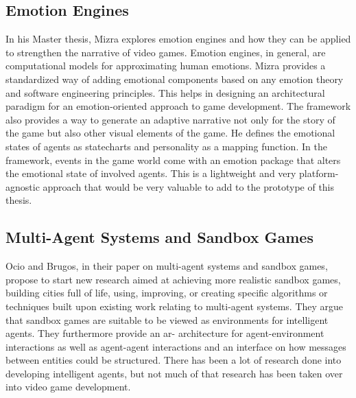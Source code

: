 \subsection{Emotion Engines}
\label{section:emotion}
In his Master thesis, Mizra explores emotion engines and how they can be applied to strengthen the narrative of video games. Emotion engines, in general, are computational models for approximating human emotions. Mizra provides a standardized way of adding emotional components based on any emotion theory and software engineering principles. This helps in designing an architectural paradigm for an emotion-oriented approach to game development. The framework also provides a way to generate an adaptive narrative not only for the story of the game but also other visual elements of the game. He defines the emotional states of agents as statecharts and personality as a mapping function. In the framework, events in the game world come with an emotion package that alters the emotional state of involved agents. This is a lightweight and very platform-agnostic approach that would be very valuable to add to the prototype of this thesis.~\cite{Mizra2021}
\subsection{Multi-Agent Systems and Sandbox Games}
Ocio and Brugos, in their paper on multi-agent systems and sandbox games, propose to start new research aimed at achieving more realistic sandbox games, building cities full of life, using, improving, or creating specific algorithms or techniques built upon existing work relating to multi-agent systems. They argue that sandbox games are suitable to be viewed as environments for intelligent agents. They furthermore provide an ar- architecture for agent-environment interactions as well as agent-agent interactions and an interface on how messages between entities could be structured. There has been a lot of research done into developing intelligent agents, but not much of that research has been taken over into video game development.~\cite{Barriales2009}